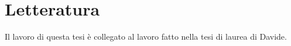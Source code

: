 \chapter{Letteratura}
\begin{idee}
	Il lavoro di questa tesi è collegato al lavoro fatto nella tesi di laurea di Davide.
	
\end{idee}
